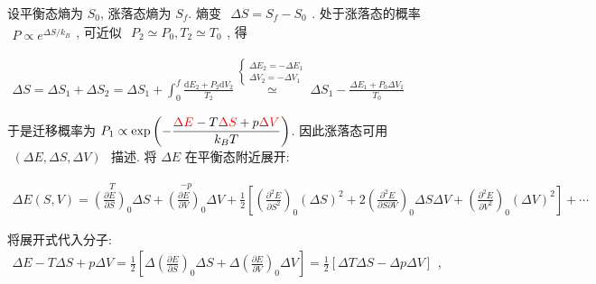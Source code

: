 \documentclass[../../main.tex]{subfiles}
\begin{document}
设平衡态熵为 $S_{0}$, 涨落态熵为 $S_{f}$. 熵变 $\begin{aligned}
    \Delta S = S_{f} - S_{0}
\end{aligned}$. 处于涨落态的概率 $\begin{aligned}
    P\propto e^{\Delta S/k_{B}}
\end{aligned}$, 可近似 $\begin{aligned}
    P_{2}\simeq P_{0},T_{2}\simeq T_{0}
\end{aligned}$, 得

$\begin{aligned}
    \Delta S = \Delta S_{1} + \Delta S_{2} = \Delta S_{1} + \int_{0}^{f}\frac{\mathrm{d}E_{2} + P_{2}\mathrm{d}V_{2}}{T_{2}} 
    \stackrel{\begin{cases}
        \Delta E_{2} = -\Delta E_{1}\\
        \Delta V_{2} = -\Delta V_{1}
    \end{cases}}{\simeq} 
    \Delta S_{1} - \frac{\Delta E_{1}+P_{0}\Delta V_{1}}{T_{0}}
\end{aligned}$

于是迁移概率为 $\begin{aligned}
    P_{1}\propto \exp{\left(
    -\frac{{\color{red}{\Delta E}} - T{\color{red}{\Delta S}} + p{\color{red}{\Delta V}}}{k_{B}T}
\right)}
\end{aligned}$. 因此涨落态可用 $\begin{aligned}
    (\Delta E,\Delta S,\Delta V)
\end{aligned}$ 描述. 将 $\Delta E$ 在平衡态附近展开: 

$\begin{aligned}
\Delta E(S,V) 
= \stackrel{T}{\left(\frac{\partial E}{\partial S}\right)_{0}}\Delta S 
+ \stackrel{-p}{\left(\frac{\partial E}{\partial V}\right)_{0}}\Delta V 
+ \frac{1}{2}\left[
    \left(\frac{\partial^{2}E}{\partial S^{2}}\right)_{0}(\Delta S)^{2} 
    + 2\left(\frac{\partial^{2}E}{\partial S \partial V}\right)_{0}\Delta S \Delta V 
    + \left(\frac{\partial^{2}E}{\partial V^{2}}\right)_{0}(\Delta V)^{2}\right] 
    + \cdots
\end{aligned}$

将展开式代入分子: 
$\begin{aligned}
    \Delta E - T\Delta S + p\Delta V = \frac{1}{2}\left[\Delta\left(\frac{\partial E}{\partial S}\right)_{0}\Delta S + \Delta\left(\frac{\partial E}{\partial V}\right)_{0}\Delta V\right] = \frac{1}{2}\left[\Delta T\Delta S - \Delta p\Delta V\right]
\end{aligned}$, 
\end{document}
